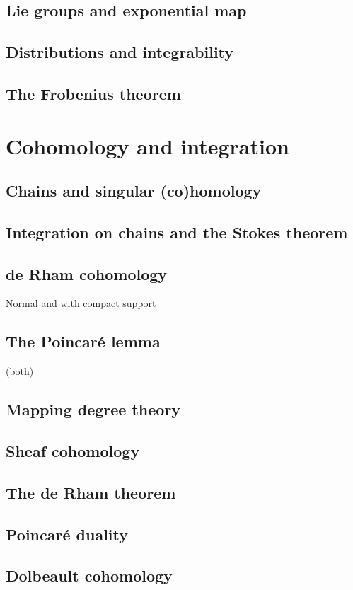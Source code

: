 \documentclass[11pt,a4paper]{book}
\theoremstyle{remark} \newtheorem{rmk}[thm]{Remark}
\theoremstyle{definition} \newtheorem{defn}[thm]{Definition}
\theoremstyle{definition} \newtheorem{ex}[thm]{Example}
\theoremstyle{definition} \newtheorem{ej}[thm]{Exercise}
\begin{document}
\section{Lie groups and exponential map}
\section{Distributions and integrability}
\section{The Frobenius theorem}

\chapter{Cohomology and integration}
\section{Chains and singular (co)homology}
\section{Integration on chains and the Stokes theorem}
\section{de Rham cohomology}
Normal and with compact support
\section{The Poincaré lemma}
(both)
\section{Mapping degree theory}
\section{Sheaf cohomology}
\section{The de Rham theorem}
\section{Poincaré duality}
\section{Dolbeault cohomology}
\end{document}
